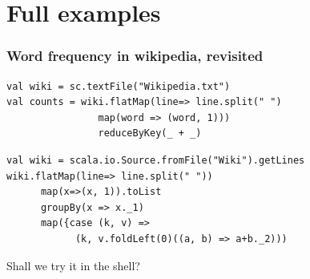 \documentclass{beamer}
\begin{document}
\section{Full examples}

\begin{frame}[fragile]
  \frametitle{Word frequency in wikipedia, revisited}
  \begin{lstlisting}[title=Spark,basicstyle=\ttfamily,linebackgroundcolor={\color{orange!30}}]
val wiki = sc.textFile("Wikipedia.txt")
val counts = wiki.flatMap(line=> line.split(" ")
                map(word => (word, 1)))
                reduceByKey(_ + _)
\end{lstlisting}

\begin{lstlisting}[title=Pure scala,basicstyle=\ttfamily]
val wiki = scala.io.Source.fromFile("Wiki").getLines
wiki.flatMap(line=> line.split(" "))
      map(x=>(x, 1)).toList
      groupBy(x => x._1)
      map({case (k, v) =>
            (k, v.foldLeft(0)((a, b) => a+b._2)))
  \end{lstlisting}
\end{frame}

\begin{frame}[plain]
  \center
  \huge{Shall we try it in the shell?}
\end{frame}

{
  \pagecolor{black}

\begin{frame}[plain]
\end{frame}
}
\end{document}
